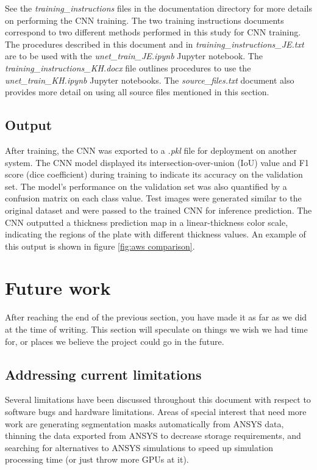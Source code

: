 \documentclass[11pt,letterpaper]{article}
\begin{document}
		See the \textit{training\_instructions} files in the documentation directory for more details on performing the CNN training. The two training instructions documents correspond to two different methods performed in this study for CNN training. The procedures described in this document and in \textit{training\_instructions\_JE.txt} are to be used with the \textit{unet\_train\_JE.ipynb} Jupyter notebook. The \textit{training\_instructions\_KH.docx} file outlines procedures to use the \textit{unet\_train\_KH.ipynb} Jupyter notebooks. The \textit{source\_files.txt} document also provides more detail on using all source files mentioned in this section.
		\subsection{Output}
		After training, the CNN was exported to a \textit{.pkl} file for deployment on another system. The CNN model displayed its intersection-over-union (IoU) value and F1 score (dice coefficient) during training to indicate its accuracy on the validation set. The model's performance on the validation set was also quantified by a confusion matrix on each class value. Test images were generated similar to the original dataset and were passed to the trained CNN for inference prediction. The CNN outputted a thickness prediction map in a linear-thickness color scale, indicating the regions of the plate with different thickness values. An example of this output is shown in figure \ref{fig:aws comparison}.
	\section{Future work}
	After reaching the end of the previous section, you have made it as far as we did at the time of writing. This section will speculate on things we wish we had time for, or places we believe the project could go in the future.
		\subsection{Addressing current limitations}
		Several limitations have been discussed throughout this document with respect to software bugs and hardware limitations. Areas of special interest that need more work are generating segmentation masks automatically from ANSYS data, thinning the data exported from ANSYS to decrease storage requirements, and searching for alternatives to ANSYS simulations to speed up simulation processing time (or just throw more GPUs at it).
\end{document}
